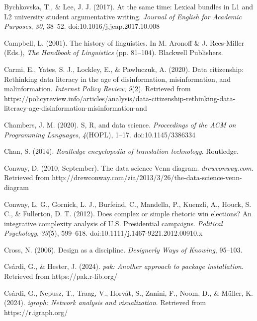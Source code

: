 \documentclass[
  letterpaper,
  krantz1]{latex/krantz-mod}
\newlength{\cslhangindent}
\newenvironment{CSLReferences}[2] %
 {\begin{list}{}{%
  \setlength{\itemindent}{0pt}
  \setlength{\leftmargin}{0pt}
  \setlength{\parsep}{0pt}
  \ifodd #1
   \setlength{\leftmargin}{\cslhangindent}
   \setlength{\itemindent}{-1\cslhangindent}
  \fi
  \setlength{\itemsep}{#2\baselineskip}}}
 {\end{list}}
\theoremstyle{definition}
\theoremstyle{definition}
\theoremstyle{remark}
\begin{document}
\begin{CSLReferences}{1}{0}
Bychkovska, T., \& Lee, J. J. (2017). At the same time: {Lexical}
bundles in {L1} and {L2} university student argumentative writing.
\emph{Journal of English for Academic Purposes}, \emph{30}, 38--52.
doi:10.1016/j.jeap.2017.10.008

Campbell, L. (2001). The history of linguistics. In M. Aronoff \& J.
Rees-Miller (Eds.), \emph{The {Handbook} of {Linguistics}} (pp.
81--104). Blackwell Publishers.

Carmi, E., Yates, S. J., Lockley, E., \& Pawluczuk, A. (2020). Data
citizenship: Rethinking data literacy in the age of disinformation,
misinformation, and malinformation. \emph{Internet Policy Review},
\emph{9}(2). Retrieved from
https://policyreview.info/articles/analysis/data-citizenship-rethinking-data-literacy-age-disinformation-misinformation-and

Chambers, J. M. (2020). S, {R}, and data science. \emph{Proceedings of
the ACM on Programming Languages}, \emph{4}(HOPL), 1--17.
doi:10.1145/3386334

Chan, S. (2014). \emph{Routledge encyclopedia of translation
technology}. Routledge.

Conway, D. (2010, September). The data science {Venn} diagram.
\emph{drewconway.com}. Retrieved from
http://drewconway.com/zia/2013/3/26/the-data-science-venn-diagram

Conway, L. G., Gornick, L. J., Burfeind, C., Mandella, P., Kuenzli, A.,
Houck, S. C., \& Fullerton, D. T. (2012). Does complex or simple
rhetoric win elections? {An} integrative complexity analysis of {U}.{S}.
Presidential campaigns. \emph{Political Psychology}, \emph{33}(5),
599--618. doi:10.1111/j.1467-9221.2012.00910.x

Cross, N. (2006). Design as a discipline. \emph{Designerly Ways of
Knowing}, 95--103.

Csárdi, G., \& Hester, J. (2024). \emph{{pak}: Another approach to
package installation}. Retrieved from https://pak.r-lib.org/

Csárdi, G., Nepusz, T., Traag, V., Horvát, S., Zanini, F., Noom, D., \&
Müller, K. (2024). \emph{{igraph}: Network analysis and visualization}.
Retrieved from https://r.igraph.org/


\end{CSLReferences}
\end{document}
